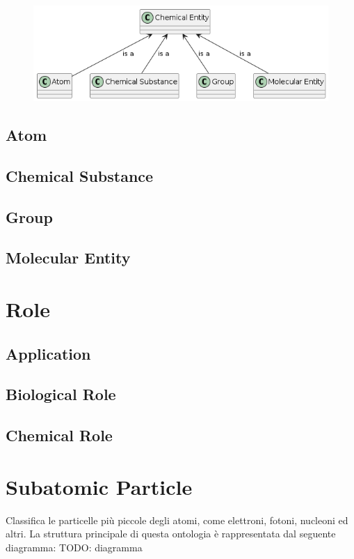 \documentclass[12pt,a4paper,openright,twoside]{book}
\begin{document}
\begin{figure}
	\centering
	\includegraphics[width=\linewidth]{figures/chemical-entity.png}
	\caption{}
	\label{fig:ChemicalEntity}
\end{figure}

\subsection{Atom}
\subsection{Chemical Substance}
\subsection{Group}
\subsection{Molecular Entity}

\section{Role}
\subsection{Application}
\subsection{Biological Role}
\subsection{Chemical Role}

\section{Subatomic Particle}
Classifica le particelle più piccole degli atomi, come elettroni, fotoni, nucleoni ed altri.
La struttura principale di questa ontologia è rappresentata dal seguente diagramma:
TODO: diagramma
\end{document}
